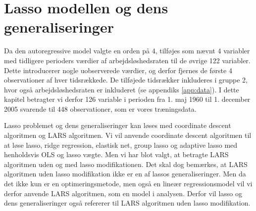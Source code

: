 \chapter{Lasso modellen og dens generaliseringer} \label{ch:shrinkage_metoder}
Da den autoregressive model valgte en orden på 4, tilføjes som nævnt 
4 variabler med tidligere perioders værdier af arbejdsløshedsraten til de øvrige 122 variabler. 
Dette introducerer nogle uobserverede værdier, og derfor fjernes de første 4 observationer af hver tidsrækkede.
De tilføjede tidsrækker inkluderes i gruppe 2, hvor også arbejdsløshedsraten er inkluderet (se appendiks \ref{app:data}).
I dette kapitel betragter vi derfor 126 variable i perioden fra 1. maj 1960 til 1. december 2005 svarende til 448 observationer, som er vores træningsdata. 

Lasso problemet og dens generaliseringer kan løses med coordinate descent algoritmen og LARS algoritmen.
Vi vil anvende coordinate descent algoritmen til at løse lasso, ridge regression, elastisk net, group lasso og adaptive lasso med henholdsvis OLS og lasso vægte.
Men vi har blot valgt, at betragte LARS algoritmen uden og med lasso modifikationen.
Det skal dog bemærkes, at LARS algoritmen uden lasso modifikation ikke er en af lassos generaliseringer. Men da det ikke kun er en optimeringsmetode, men også en lineær regressionsmodel vil vi derfor anvende LARS algoritmen, som en model i analysen.  Derfor vil lasso og dens generaliseringer også refererer til LARS algoritmen uden lasso modifikation.  



